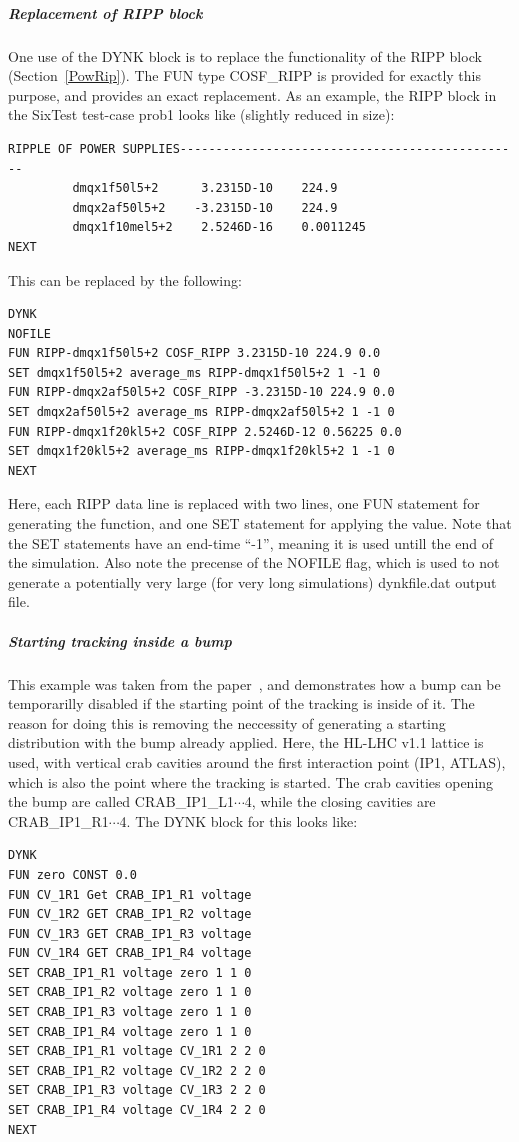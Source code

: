 \subparagraph{Replacement of RIPP block}
One use of the DYNK block is to replace the functionality of the RIPP block (Section~\ref{PowRip}).
The FUN type COSF\_RIPP is provided for exactly this purpose, and provides an exact replacement.
As an example, the RIPP block in the SixTest test-case prob1 looks like (slightly reduced in size):
\begin{verbatim}
RIPPLE OF POWER SUPPLIES------------------------------------------------
         dmqx1f50l5+2      3.2315D-10    224.9
         dmqx2af50l5+2    -3.2315D-10    224.9
         dmqx1f10mel5+2    2.5246D-16    0.0011245
NEXT
\end{verbatim}
This can be replaced by the following:
\begin{verbatim}
DYNK
NOFILE
FUN RIPP-dmqx1f50l5+2 COSF_RIPP 3.2315D-10 224.9 0.0
SET dmqx1f50l5+2 average_ms RIPP-dmqx1f50l5+2 1 -1 0
FUN RIPP-dmqx2af50l5+2 COSF_RIPP -3.2315D-10 224.9 0.0
SET dmqx2af50l5+2 average_ms RIPP-dmqx2af50l5+2 1 -1 0
FUN RIPP-dmqx1f20kl5+2 COSF_RIPP 2.5246D-12 0.56225 0.0
SET dmqx1f20kl5+2 average_ms RIPP-dmqx1f20kl5+2 1 -1 0
NEXT
\end{verbatim}
Here, each RIPP data line is replaced with two lines, one FUN statement for generating the function, and one SET statement for applying the value.
Note that the SET statements have an end-time ``-1'', meaning it is used untill the end of the simulation.
Also note the precense of the NOFILE flag, which is used to not generate a potentially very large (for very long simulations) dynkfile.dat output file.

\subparagraph{Starting tracking inside a bump}

This example was taken from the paper~\cite{DYNKpaper}, and demonstrates how a bump can be temporarilly disabled if the starting point of the tracking is inside of it.
The reason for doing this is removing the neccessity of generating a starting distribution with the bump already applied.
Here, the HL-LHC v1.1 lattice is used, with vertical crab cavities around the first interaction point (IP1, ATLAS), which is also the point where the tracking is started.
The crab cavities opening the bump are called CRAB\_IP1\_L1$\cdots$4, while the closing cavities are CRAB\_IP1\_R1$\cdots$4.
The DYNK block for this looks like:
\begin{verbatim}
DYNK
FUN zero CONST 0.0
FUN CV_1R1 Get CRAB_IP1_R1 voltage
FUN CV_1R2 GET CRAB_IP1_R2 voltage
FUN CV_1R3 GET CRAB_IP1_R3 voltage
FUN CV_1R4 GET CRAB_IP1_R4 voltage
SET CRAB_IP1_R1 voltage zero 1 1 0
SET CRAB_IP1_R2 voltage zero 1 1 0
SET CRAB_IP1_R3 voltage zero 1 1 0
SET CRAB_IP1_R4 voltage zero 1 1 0
SET CRAB_IP1_R1 voltage CV_1R1 2 2 0
SET CRAB_IP1_R2 voltage CV_1R2 2 2 0
SET CRAB_IP1_R3 voltage CV_1R3 2 2 0
SET CRAB_IP1_R4 voltage CV_1R4 2 2 0
NEXT
\end{verbatim}

